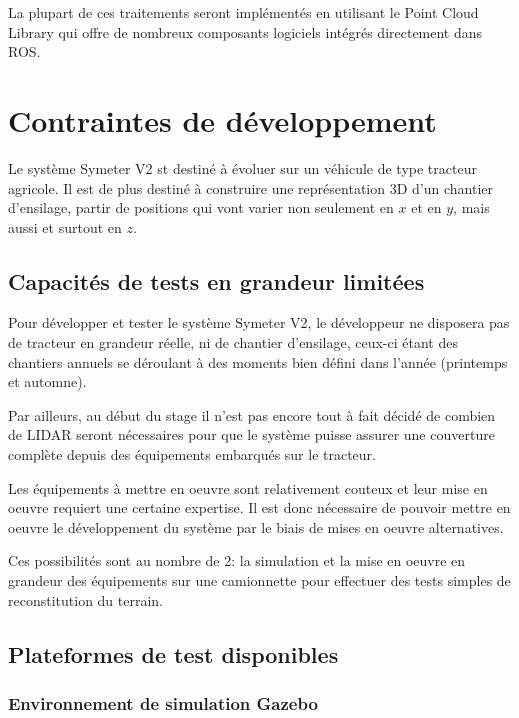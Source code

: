 \documentclass[12pt,a4paper]{report}
\begin{document}
 		\para La plupart de ces traitements seront implémentés en utilisant le Point Cloud Library qui offre de nombreux composants logiciels intégrés directement dans ROS.

			
	\section{Contraintes de développement}
		Le système Symeter V2 st destiné à évoluer sur un véhicule de type tracteur agricole. Il est de plus destiné à construire une représentation 3D d'un chantier d'ensilage, partir de positions qui vont varier non seulement en $x$ et en $y$, mais aussi et surtout en $z$.
		
		\subsection{Capacités de tests en grandeur limitées}
		Pour développer et tester le système Symeter V2, le développeur ne disposera pas de tracteur en grandeur réelle, ni de chantier d'ensilage, ceux-ci étant des chantiers annuels se déroulant à des moments bien défini dans l'année (printemps et automne).
		
		
		\para Par ailleurs, au début du stage il n'est pas encore tout à fait décidé de combien de LIDAR seront nécessaires pour que le système puisse assurer une couverture complète depuis des équipements embarqués sur le tracteur.
		
		\para Les équipements à mettre en oeuvre sont relativement couteux et leur mise en oeuvre requiert une certaine expertise. Il est donc nécessaire de pouvoir mettre en oeuvre le développement du système par le biais de mises en oeuvre alternatives.
		
		\para Ces possibilités sont au nombre de 2: la simulation et la mise en oeuvre en grandeur des équipements sur une camionnette pour effectuer des tests simples de reconstitution du terrain.
		
		\subsection{Plateformes de test disponibles}
			
			\subsubsection{Environnement de simulation Gazebo}
			
\end{document}
